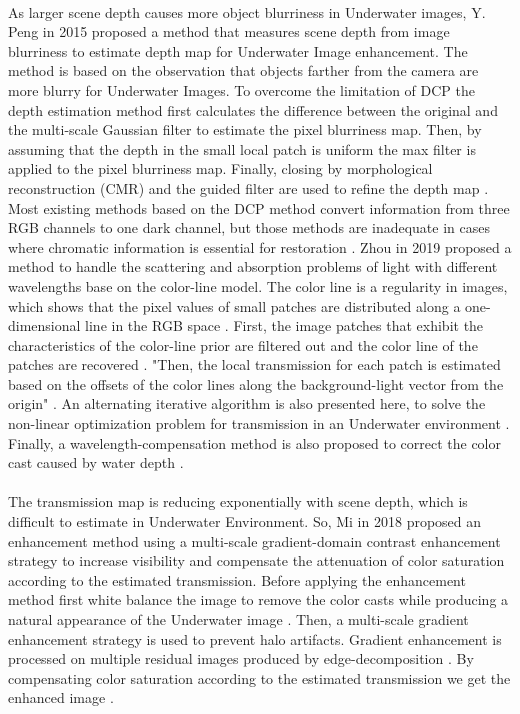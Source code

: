 \documentclass[a4paper,11pt,oneside]{article}
\begin{document}
  \\
  As larger scene depth causes more object blurriness in Underwater images, Y. Peng in 2015 \cite{3} proposed a method that measures scene depth from image blurriness to estimate depth map for Underwater Image enhancement. The method is based on the observation that objects farther from the camera are more blurry for Underwater Images. To overcome the limitation of DCP the depth estimation method first calculates the difference between the original and the multi-scale Gaussian filter to estimate the pixel blurriness map. Then, by assuming that the depth in the small local patch is uniform the max filter is applied to the pixel blurriness map. Finally, closing by morphological reconstruction (CMR) and the guided filter are used to refine the depth map \cite{3}.\\
   Most existing methods based on the DCP method convert information from three RGB channels to one dark channel, but those methods are inadequate in cases where chromatic information is essential for restoration \cite{17}. Zhou in 2019 \cite{17} proposed a method to handle the scattering and absorption problems of light with different wavelengths base on the color-line model. The color line is a regularity in images, which shows that the pixel values of small patches are distributed along a  one-dimensional line in the RGB space \cite{17}. First, the image patches that exhibit the characteristics of the color-line prior are filtered out and the color line of the patches are recovered \cite{17}. "Then, the local transmission for each patch is estimated based on the offsets of the color lines along the background-light vector from the origin" \cite{17}. An alternating iterative algorithm is also presented here, to solve the non-linear optimization problem for transmission in an Underwater environment \cite{17}. Finally, a wavelength-compensation method is also proposed to correct the color cast caused by water depth \cite{17}.\\
  \\
  The transmission map is reducing exponentially with scene depth, which is difficult to estimate in Underwater Environment. So, Mi in 2018 \cite{11} proposed an enhancement method using a multi-scale gradient-domain contrast enhancement strategy to increase visibility and compensate the attenuation of color saturation according to the estimated transmission. Before applying the enhancement method first white balance the image to remove the color casts while producing a natural appearance of the Underwater image \cite{11}. Then, a multi-scale gradient enhancement strategy is used to prevent halo artifacts. Gradient enhancement is processed on multiple residual images produced by edge-decomposition \cite{11}. By compensating color saturation according to the estimated transmission we get the enhanced image \cite{11}.\\ 
\end{document}
